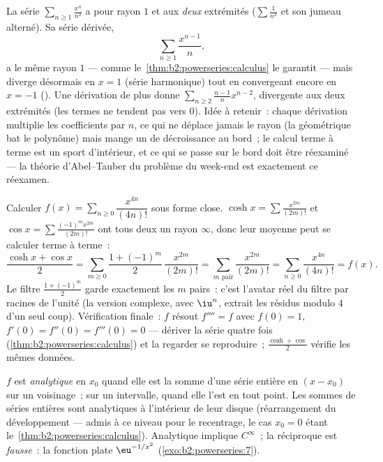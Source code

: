 \begin{example}\label{ex:b2:powerseries:boundaryloss}
La série $\sum_{n\geq1}\frac{x^n}{n^2}$ a pour rayon $1$ et
 aux \emph{deux} extrémités ($\sum\frac1{n^2}$ et son
jumeau alterné). Sa série dérivée,
\[
\sum_{n\geq1}\frac{x^{n-1}}{n} ,
\]
a le même rayon $1$ --- comme
le~\cref{thm:b2:powerseries:calculus} le garantit --- mais diverge
désormais en $x = 1$ (série harmonique) tout en convergeant encore
en $x = -1$ (). Une dérivation de plus donne
$\sum_{n\geq2}\frac{n-1}{n}x^{n-2}$, divergente aux deux
extrémités (les termes ne tendent pas vers $0$). Idée à retenir~:
chaque dérivation multiplie les coefficients par $n$, ce qui
ne déplace jamais le rayon (la géométrique bat le polynôme) mais
mange un  de décroissance au bord~; le calcul terme à terme est
un sport d'intérieur, et ce qui se passe sur le bord doit être
réexaminé --- la théorie d'Abel--Tauber du problème du week-end est
exactement ce réexamen.
\end{example}

\begin{example}\label{ex:b2:powerseries:quarter}
Calculer $f(x) = \sum_{n\geq0} \dfrac{x^{4n}}{(4n)!}$ sous forme
close. $\cosh x = \sum \frac{x^{2m}}{(2m)!}$ et $\cos x =
\sum \frac{(-1)^m x^{2m}}{(2m)!}$ ont tous deux un rayon $\infty$,
donc leur moyenne peut se calculer terme à terme~:
\[
\frac{\cosh x + \cos x}{2}
= \sum_{m\geq0}\frac{1 + (-1)^m}{2}\,\frac{x^{2m}}{(2m)!}
= \sum_{m \text{ pair}}\frac{x^{2m}}{(2m)!}
= \sum_{n\geq0}\frac{x^{4n}}{(4n)!} = f(x) .
\]
Le filtre $\frac{1+(-1)^m}{2}$ garde exactement les $m$ pairs~: c'est
l'avatar réel du filtre par racines de l'unité (la version complexe,
avec $\iu^n$, extrait les résidus modulo $4$ d'un seul coup). Vérification
finale~: $f$ résout $f'''' = f$ avec $f(0) = 1$,
$f'(0) = f''(0) = f'''(0) = 0$ --- dériver la série quatre
fois (\cref{thm:b2:powerseries:calculus}) et la regarder se
reproduire~; $\frac{\cosh + \cos}{2}$ vérifie les mêmes
données.
\end{example}

\begin{definition}\label{def:b2:powerseries:analytic}
$f$ est \emph{analytique} en $x_0$ quand
elle est la somme d'une série entière en $(x - x_0)$ sur un voisinage~; sur un
intervalle, quand elle l'est en tout point. Les sommes de séries entières sont analytiques
à l'intérieur de leur disque (réarrangement du développement ---
admis à ce niveau pour le recentrage, le cas $x_0 = 0$ étant
le~\cref{thm:b2:powerseries:calculus}). Analytique implique $C^\infty$~;
la réciproque est \emph{fausse}~: la fonction plate $\eu^{-1/x^2}$
(\cref{exo:b2:powerseries:7}).
\end{definition}

